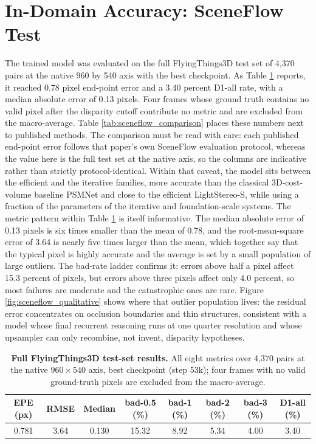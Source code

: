 \section{In-Domain Accuracy: SceneFlow Test}
The trained model was evaluated on the full FlyingThings3D test set of
4,370 pairs at the native 960 by 540 axis with the best checkpoint. As
Table \ref{tab:sceneflow_results} reports, it reached 0.78 pixel
end-point error and a 3.40 percent D1-all rate, with a median absolute
error of 0.13 pixels. Four frames whose ground truth contains no valid
pixel after the disparity cutoff contribute no metric and are excluded
from the macro-average. Table \ref{tab:sceneflow_comparison} places these
numbers next to published methods. The comparison must be read with care:
each published end-point error follows that paper's own SceneFlow
evaluation protocol, whereas the value here is the full test set at the
native axis, so the columns are indicative rather than strictly
protocol-identical. Within that caveat, the model sits between the
efficient and the iterative families, more accurate than the classical
3D-cost-volume baseline PSMNet and close to the efficient LightStereo-S,
while using a fraction of the parameters of the iterative and
foundation-scale systems. The metric pattern within Table \ref{tab:sceneflow_results} is itself
informative. The median absolute error of 0.13 pixels is six times
smaller than the mean of 0.78, and the root-mean-square error of 3.64 is
nearly five times larger than the mean, which together say that the
typical pixel is highly accurate and the average is set by a small
population of large outliers. The bad-rate ladder confirms it: errors
above half a pixel affect 15.3 percent of pixels, but errors above three
pixels affect only 4.0 percent, so most failures are moderate and the
catastrophic ones are rare. Figure \ref{fig:sceneflow_qualitative} shows
where that outlier population lives: the residual error concentrates on
occlusion boundaries and thin structures, consistent with a model whose
final recurrent reasoning runs at one quarter resolution and whose
upsampler can only recombine, not invent, disparity hypotheses.

\begin{table}[!htbp]
\centering
\caption{\textbf{Full FlyingThings3D test-set results.} All eight metrics over 4{,}370 pairs at the native $960\times 540$ axis, best checkpoint (step 53k); four frames with no valid ground-truth pixels are excluded from the macro-average.}
\label{tab:sceneflow_results}
\small
\begin{tabular}{cccccccc}
\toprule
EPE (px) & RMSE & Median & bad-0.5 (\%) & bad-1 (\%) & bad-2 (\%) & bad-3 (\%) & D1-all (\%)\\
\midrule
0.781 & 3.64 & 0.130 & 15.32 & 8.92 & 5.34 & 4.00 & 3.40\\
\bottomrule
\end{tabular}
\end{table}

